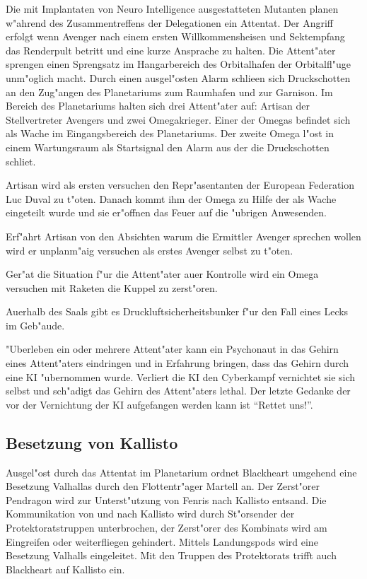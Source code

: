 Die mit Implantaten von Neuro Intelligence ausgestatteten Mutanten planen w"ahrend des Zusammentreffens der Delegationen ein Attentat. Der Angriff erfolgt wenn Avenger nach einem ersten Willkommensheisen und Sektempfang das Renderpult betritt und eine kurze Ansprache zu halten. Die Attent"ater sprengen einen Sprengsatz im Hangarbereich des Orbitalhafen der Orbitalfl"uge unm"oglich macht. Durch einen ausgel"osten Alarm schlie\3en sich Druckschotten an den Zug"angen des Planetariums zum Raumhafen und zur Garnison. Im Bereich des Planetariums halten sich drei Attent"ater auf: Artisan der Stellvertreter Avengers und zwei Omegakrieger. Einer der Omegas befindet sich als Wache im Eingangsbereich des Planetariums. Der zweite Omega l"ost in einem Wartungsraum als Startsignal den Alarm aus der die Druckschotten schlie\3t.

\begin{remarks}
Artisan wird als ersten versuchen den Repr"asentanten der European Federation Luc Duval zu t"oten. Danach kommt ihm der Omega zu Hilfe der als Wache eingeteilt wurde und sie er"offnen das Feuer auf die "ubrigen Anwesenden.

Erf"ahrt Artisan von den Absichten warum die Ermittler Avenger sprechen wollen wird er unplanm"a\3ig versuchen als erstes Avenger selbst zu t"oten.

Ger"at die Situation f"ur die Attent"ater au\3er Kontrolle wird ein Omega versuchen mit Raketen die Kuppel zu zerst"oren.

Au\3erhalb des Saals gibt es Druckluftsicherheitsbunker f"ur den Fall eines Lecks im Geb"aude.

"Uberleben ein oder mehrere Attent"ater kann ein Psychonaut in das Gehirn eines Attent"aters eindringen und in Erfahrung bringen, dass das Gehirn durch eine KI "ubernommen wurde. Verliert die KI den Cyberkampf vernichtet sie sich selbst und sch"adigt das Gehirn des Attent"aters lethal. Der letzte Gedanke der vor der Vernichtung der KI aufgefangen werden kann ist "`Rettet uns!"'.
\end{remarks}

\subsection{Besetzung von Kallisto}

Ausgel"ost durch das Attentat im Planetarium ordnet Blackheart umgehend eine Besetzung Valhallas durch den Flottentr"ager Martell an. Der Zerst"orer Pendragon wird zur Unterst"utzung von Fenris nach Kallisto entsand. Die Kommunikation von und nach Kallisto wird durch St"orsender der Protektoratstruppen unterbrochen, der Zerst"orer des Kombinats wird am Eingreifen oder weiterfliegen gehindert. Mittels Landungspods wird eine Besetzung Valhalls eingeleitet. Mit den Truppen des Protektorats trifft auch Blackheart auf Kallisto ein.


